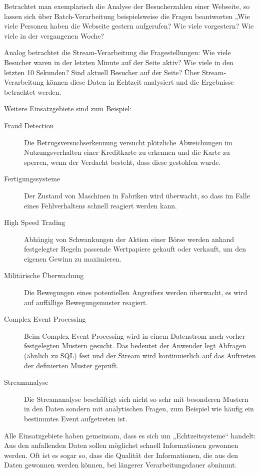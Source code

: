 \documentclass[a4paper,11pt]{scrartcl}
\begin{document}
  Betrachtet man exemplarisch die Analyse der Besucherzahlen einer Webseite, so
  lassen sich über Batch-Verarbeitung beispielsweise die Fragen beantworten „Wie
  viele Personen haben die Webseite gestern aufgerufen? Wie viele vorgestern?
  Wie viele in der vergangenen Woche?

  Analog betrachtet die Stream-Verarbeitung die Fragestellungen: Wie viele
  Besucher waren in der letzten Minute auf der Seite aktiv? Wie viele in den
  letzten 10 Sekunden? Sind aktuell Besucher auf der Seite? Über
  Stream-Verarbeitung können diese Daten in Echtzeit analysiert und die Ergebnisse
  betrachtet werden.

  Weitere Einsatzgebiete sind zum Beispiel:\cite[S.~465ff.]{kleppmann17}
  \begin{description}
    \item[Fraud Detection] Die Betrugsversuchserkennung versucht plötzliche
      Abweichungen im Nutzungsverhalten einer Kreditkarte zu erkennen und die
      Karte zu sperren, wenn der Verdacht besteht, dass diese gestohlen wurde.
    \item[Fertigungssysteme] Der Zustand von Maschinen in Fabriken wird
      überwacht, so dass im Falle eines Fehlverhaltens schnell reagiert werden
      kann.
    \item[High Speed Trading] Abhängig von Schwankungen der Aktien einer Börse
      werden anhand festgelegter Regeln passende Wertpapiere gekauft oder
      verkauft, um den eigenen Gewinn zu maximieren.
    \item[Militärische Überwachung] Die Bewegungen eines potentiellen
      Angreifers werden überwacht, es wird auf auffällige Bewegungsmuster
      reagiert.
    \item[Complex Event Processing] Beim Complex Event Processing wird in einem
      Datenstrom nach vorher festgelegten Mustern gesucht. Das bedeutet der
      Anwender legt Abfragen (ähnlich zu SQL) fest und der Stream wird
      kontinuierlich auf das Auftreten der definierten Muster geprüft.
    \item[Streamanalyse] Die Streamanalyse beschäftigt sich nicht so sehr mit
      besonderen Mustern in den Daten sondern mit analytischen Fragen, zum
      Beispiel wie häufig ein bestimmtes Event aufgetreten ist.
  \end{description}

  Alle Einsatzgebiete haben gemeinsam, dass es sich um „Echtzeitsysteme“ handelt:
  Aus den anfallenden Daten sollen möglichst schnell Informationen gewonnen
  werden. Oft ist es sogar so, dass die Qualität der Informationen, die aus den
  Daten gewonnen werden können, bei längerer Verarbeitungsdauer abnimmt.
\end{document}
